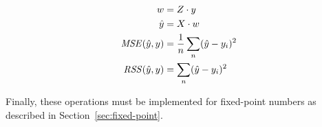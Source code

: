 \begin{align*}
w &= Z \cdot y
\\
\hat{y} &= X \cdot w
\\
\mathit{MSE}(\hat{y}, y) &= \frac{1}{n} \sum_n (\hat{y} - y_i)^2 
\\
\mathit{RSS}(\hat{y}, y) &= \sum_n (\hat{y} - y_i)^2 
\end{align*}










Finally, these operations must be implemented for fixed-point numbers as described in Section~\ref{sec:fixed-point}.
